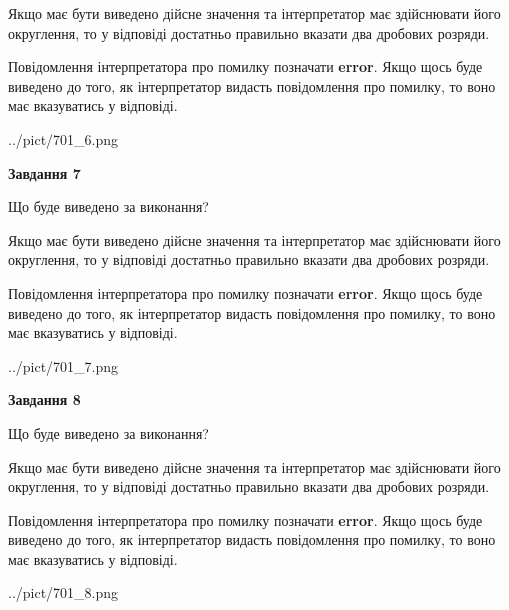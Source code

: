 \documentclass[12pt, ukrainian]{article}
\begin{document}
{\begin {Large}
Якщо має бути виведено дійсне значення та інтерпретатор має здійснювати його округлення, 
то у відповіді достатньо правильно вказати два дробових розряди.

Повідомлення інтерпретатора про помилку позначати \textbf{error}.
Якщо щось буде виведено до того, як інтерпретатор видасть повідомлення про помилку, 
то воно має вказуватись у відповіді. \par

\begin{center}
	{../pict/701_6.png}
\end{center}
\newpage

{\begin {center}\textbf{Завдання 7}\end {center}}\par
Що буде виведено за виконання? \par

Якщо має бути виведено дійсне значення та інтерпретатор має здійснювати його округлення, 
то у відповіді достатньо правильно вказати два дробових розряди.

Повідомлення інтерпретатора про помилку позначати \textbf{error}.
Якщо щось буде виведено до того, як інтерпретатор видасть повідомлення про помилку, 
то воно має вказуватись у відповіді. \par

\begin{center}
	{../pict/701_7.png}
\end{center}
\newpage

{\begin {center}\textbf{Завдання 8}\end {center}}\par
Що буде виведено за виконання? \par

Якщо має бути виведено дійсне значення та інтерпретатор має здійснювати його округлення, 
то у відповіді достатньо правильно вказати два дробових розряди.

Повідомлення інтерпретатора про помилку позначати \textbf{error}.
Якщо щось буде виведено до того, як інтерпретатор видасть повідомлення про помилку, 
то воно має вказуватись у відповіді. \par

\begin{center}
	{../pict/701_8.png}
\end{center}
\newpage


\end{Large}}
\end{document}
